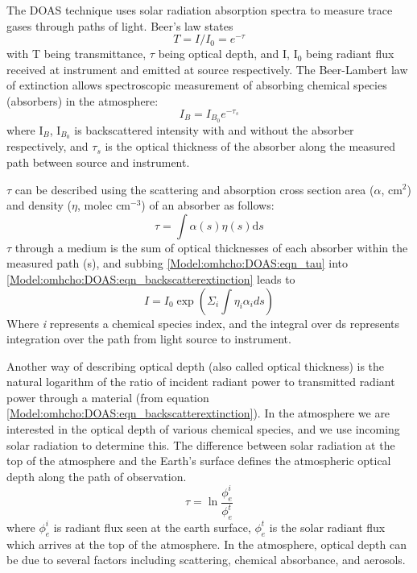     The DOAS technique uses solar radiation absorption spectra to measure trace gases through paths of light.
    Beer's law states
    \begin{equation} \label{Model:omhcho:DOAS:eqn_beerslaw}
    T = I/I_0 = e^{-\tau}
    \end{equation}
    with T being transmittance, $\tau$ being optical depth, and I, I$_0$ being radiant flux received at instrument and emitted at source respectively.
    The Beer-Lambert law of extinction allows spectroscopic measurement of absorbing chemical species (absorbers) in the atmosphere:
    \begin{equation} \label{Model:omhcho:DOAS:eqn_backscatterextinction}
    I_B = I_{B_0} e^{-\tau_s}
    \end{equation}
    where I$_B$, I$_{B_0}$ is backscattered intensity with and without the absorber respectively, and $\tau_s$ is the optical thickness of the absorber along the measured path between source and instrument.
    
    $\tau$ can be described using the scattering and absorption cross section area ($\alpha$, cm$^{2}$) and density ($\eta$, molec cm$^{-3}$) of an absorber as follows:
    \begin{equation} \label{Model:omhcho:DOAS:eqn_tau}
    \tau = \int \alpha(s) \eta(s) \mathrm{d}s
    \end{equation}
    $\tau$ through a medium is the sum of optical thicknesses of each absorber within the measured path (s), and subbing \ref{Model:omhcho:DOAS:eqn_tau} into \ref{Model:omhcho:DOAS:eqn_backscatterextinction} leads to
    \begin{equation*}
      I = I_0 \exp { \left( \Sigma_i \int \eta_i \alpha_i ds \right) }
    \end{equation*}
    Where \textit{i} represents a chemical species index, and the integral over ds represents integration over the path from light source to instrument.
    
    Another way of describing optical depth (also called optical thickness) is the natural logarithm of the ratio of incident radiant power to transmitted radiant power through a material (from equation \ref{Model:omhcho:DOAS:eqn_backscatterextinction}).
    In the atmosphere we are interested in the optical depth of various chemical species, and we use incoming solar radiation to determine this.
    The difference between solar radiation at the top of the atmosphere and the Earth's surface defines the atmospheric optical depth along the path of observation.
    \begin{equation*}
      \tau = \ln{\frac{\phi_e^i}{\phi_e^t}}
    \end{equation*}
    where $\phi_e^i$ is radiant flux seen at the earth surface, $\phi_e^t$ is the solar radiant flux which arrives at the top of the atmosphere.
    In the atmosphere, optical depth can be due to several factors including scattering, chemical absorbance, and aerosols.
  
